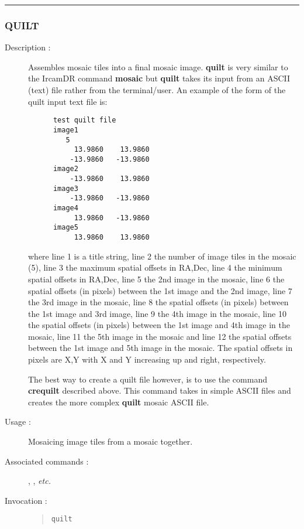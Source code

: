 \hrule 
\subsubsection*{\label{QUILT}QUILT}

\begin{description}

\item[Description :] Assembles mosaic tiles into a final mosaic image.
{\bf quilt} is very similar to the {\sc IrcamDR} command {\bf mosaic}
but {\bf quilt} takes its input from an ASCII (text) file rather from
the terminal/user.  An example of the form of the quilt input text file
is:

\begin{small}
\begin{verbatim}
      test quilt file
      image1
         5
           13.9860    13.9860
          -13.9860   -13.9860
      image2
          -13.9860    13.9860
      image3
          -13.9860   -13.9860
      image4
           13.9860   -13.9860
      image5
           13.9860    13.9860
\end{verbatim}
\end{small}

where line 1 is a title string, line 2 the number of image tiles in the
mosaic (5), line 3 the maximum spatial offsets in RA,Dec, line 4 the
minimum spatial offsets in RA,Dec, line 5 the 2nd image in the mosaic,
line 6 the spatial offsets (in pixels) between the 1st image and the 2nd
image, line 7 the 3rd image in the mosaic, line 8 the spatial offsets (in
pixels) between the 1st image and 3rd image, line 9 the 4th image in the
mosaic, line 10 the spatial offsets (in pixels) between the 1st image and
4th image in the mosaic, line 11 the 5th image in the mosaic and line 12
the spatial offsets between the 1st image and 5th image in the mosaic.
The spatial offsets in pixels are X,Y with X and Y increasing up and
right, respectively.

The best way to create a quilt file however, is to use the command
{\bf crequilt} described above.  This command takes in simple ASCII files and
creates the more complex {\bf quilt} mosaic ASCII file.


\item[Usage :] Mosaicing image tiles from a mosaic together.

\item[Associated commands :] {\tt {}}, 
{\tt {}}, {\tt {}} \emph{etc.}

\item[Invocation :]

\begin{quote}{\tt  quilt }\end{quote}

\end{description}

